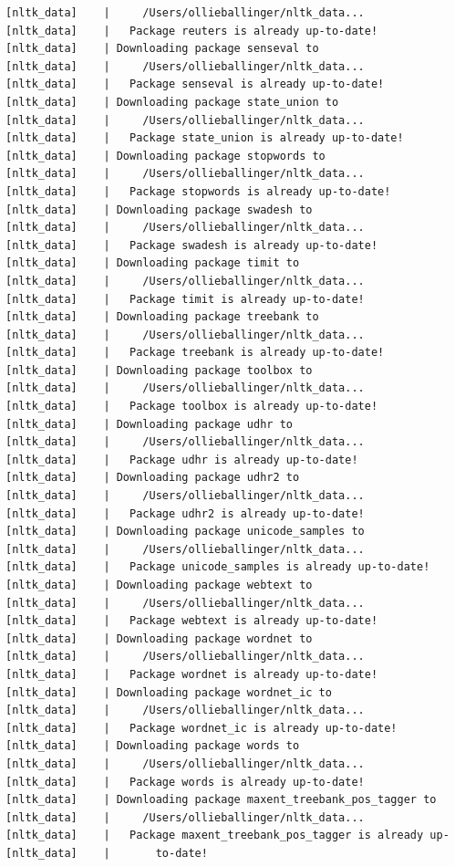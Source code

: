 \documentclass[
  letterpaper,
  DIV=11,
  numbers=noendperiod]{scrreprt}
\begin{document}
\begin{verbatim}
[nltk_data]    |     /Users/ollieballinger/nltk_data...
[nltk_data]    |   Package reuters is already up-to-date!
[nltk_data]    | Downloading package senseval to
[nltk_data]    |     /Users/ollieballinger/nltk_data...
[nltk_data]    |   Package senseval is already up-to-date!
[nltk_data]    | Downloading package state_union to
[nltk_data]    |     /Users/ollieballinger/nltk_data...
[nltk_data]    |   Package state_union is already up-to-date!
[nltk_data]    | Downloading package stopwords to
[nltk_data]    |     /Users/ollieballinger/nltk_data...
[nltk_data]    |   Package stopwords is already up-to-date!
[nltk_data]    | Downloading package swadesh to
[nltk_data]    |     /Users/ollieballinger/nltk_data...
[nltk_data]    |   Package swadesh is already up-to-date!
[nltk_data]    | Downloading package timit to
[nltk_data]    |     /Users/ollieballinger/nltk_data...
[nltk_data]    |   Package timit is already up-to-date!
[nltk_data]    | Downloading package treebank to
[nltk_data]    |     /Users/ollieballinger/nltk_data...
[nltk_data]    |   Package treebank is already up-to-date!
[nltk_data]    | Downloading package toolbox to
[nltk_data]    |     /Users/ollieballinger/nltk_data...
[nltk_data]    |   Package toolbox is already up-to-date!
[nltk_data]    | Downloading package udhr to
[nltk_data]    |     /Users/ollieballinger/nltk_data...
[nltk_data]    |   Package udhr is already up-to-date!
[nltk_data]    | Downloading package udhr2 to
[nltk_data]    |     /Users/ollieballinger/nltk_data...
[nltk_data]    |   Package udhr2 is already up-to-date!
[nltk_data]    | Downloading package unicode_samples to
[nltk_data]    |     /Users/ollieballinger/nltk_data...
[nltk_data]    |   Package unicode_samples is already up-to-date!
[nltk_data]    | Downloading package webtext to
[nltk_data]    |     /Users/ollieballinger/nltk_data...
[nltk_data]    |   Package webtext is already up-to-date!
[nltk_data]    | Downloading package wordnet to
[nltk_data]    |     /Users/ollieballinger/nltk_data...
[nltk_data]    |   Package wordnet is already up-to-date!
[nltk_data]    | Downloading package wordnet_ic to
[nltk_data]    |     /Users/ollieballinger/nltk_data...
[nltk_data]    |   Package wordnet_ic is already up-to-date!
[nltk_data]    | Downloading package words to
[nltk_data]    |     /Users/ollieballinger/nltk_data...
[nltk_data]    |   Package words is already up-to-date!
[nltk_data]    | Downloading package maxent_treebank_pos_tagger to
[nltk_data]    |     /Users/ollieballinger/nltk_data...
[nltk_data]    |   Package maxent_treebank_pos_tagger is already up-
[nltk_data]    |       to-date!

\end{verbatim}
\end{document}
